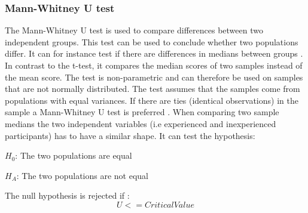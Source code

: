 


\subsubsection{Mann-Whitney U test}\label{sec:mannwhiteyu}
The Mann-Whitney U test is used to compare differences between two independent groups. This test can be used to conclude whether two populations differ. It can for instance test if there are differences in medians between groups \citep{LundResearchLtd2013b}. In contrast to the t-test, it compares the median scores of two samples instead of the mean score. The test is non-parametric and can therefore be used on samples that are not normally distributed. The test assumes that the samples come from populations with equal variances. If there are ties (identical observations) in the sample a Mann-Whitney U test is preferred \citep{TheScipycommunity2017}.  When comparing two sample medians the two independent variables (i.e experienced and inexperienced participants) has to have a similar shape. It can test the hypothesis: \\

\centerline{$H_{0}$: The two populations are equal} 
\centerline{$H_{A}$: The two populations are not equal}

The null hypothesis is rejected if \citep{LaMorte2017}: \\

\begin{equation}
\label{eq:mannwhitey-ciritcalvalue}
U <= Critical Value
\end{equation}

